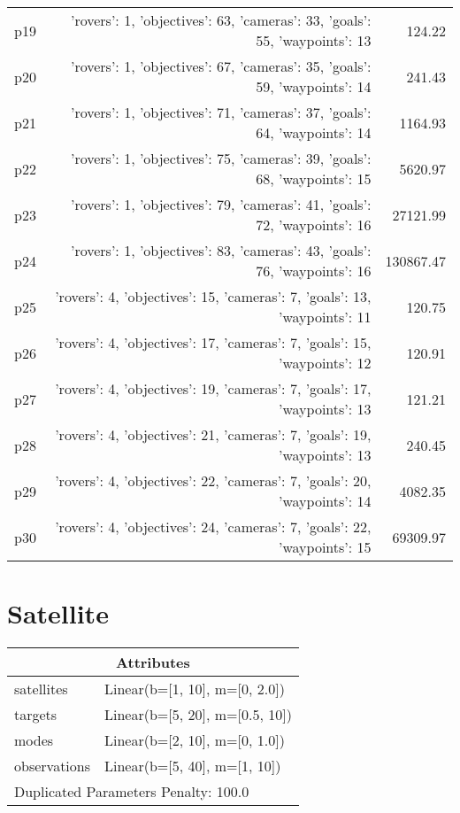 \documentclass{article}
\begin{document}
\begin{center}
\begin{tabular}{@{}l|r|r@{}}
  p19&{'rovers': 1, 'objectives': 63, 'cameras': 33, 'goals': 55, 'waypoints': 13}&124.22\\
  p20&{'rovers': 1, 'objectives': 67, 'cameras': 35, 'goals': 59, 'waypoints': 14}&241.43\\
  p21&{'rovers': 1, 'objectives': 71, 'cameras': 37, 'goals': 64, 'waypoints': 14}&1164.93\\
  p22&{'rovers': 1, 'objectives': 75, 'cameras': 39, 'goals': 68, 'waypoints': 15}&5620.97\\
  p23&{'rovers': 1, 'objectives': 79, 'cameras': 41, 'goals': 72, 'waypoints': 16}&27121.99\\
  p24&{'rovers': 1, 'objectives': 83, 'cameras': 43, 'goals': 76, 'waypoints': 16}&130867.47\\
  p25&{'rovers': 4, 'objectives': 15, 'cameras': 7, 'goals': 13, 'waypoints': 11}&120.75\\
  p26&{'rovers': 4, 'objectives': 17, 'cameras': 7, 'goals': 15, 'waypoints': 12}&120.91\\
  p27&{'rovers': 4, 'objectives': 19, 'cameras': 7, 'goals': 17, 'waypoints': 13}&121.21\\
  p28&{'rovers': 4, 'objectives': 21, 'cameras': 7, 'goals': 19, 'waypoints': 13}&240.45\\
  p29&{'rovers': 4, 'objectives': 22, 'cameras': 7, 'goals': 20, 'waypoints': 14}&4082.35\\
  p30&{'rovers': 4, 'objectives': 24, 'cameras': 7, 'goals': 22, 'waypoints': 15}&69309.97
                            \end{tabular}
                            \end{center}
                    
                            \newpage \section{Satellite}
                    \begin{center}
                    \begin{tabular}{@{}p{}p{}@{}}
                    \multicolumn{2}{c}{\bf \large Attributes}\\\midrule
                    satellites & Linear(b=[1, 10], m=[0, 2.0])\\
targets & Linear(b=[5, 20], m=[0.5, 10])\\
modes & Linear(b=[2, 10], m=[0, 1.0])\\
observations & Linear(b=[5, 40], m=[1, 10]) \\\midrule
                    \multicolumn{2}{l}{Duplicated Parameters Penalty: 100.0}
                    \end{tabular}
                    \end{center}
                
\end{document}

